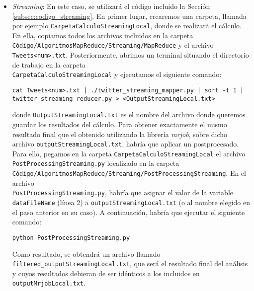 \documentclass[10pt, spanish]{article}
\begin{document}
\begin{appendices}
\begin{itemize}
\begin{itemize}
\begin{itemize}
\end{itemize}
\item \textit{Streaming}: En este caso, se utilizará el código incluido la Sección \ref{subsec:codigo_streaming}. En primer lugar, crearemos una carpeta, llamada por ejemplo \texttt{CarpetaCalculoStreamingLocal}, donde se realizará el cálculo. En ella, copiamos todos los archivos incluidos en la carpeta \\
\texttt{Código/AlgoritmosMapReduce/Streaming/MapReduce} y el archivo \texttt{Tweets<num>.txt}. Posteriormente, abrimos un terminal situando el directorio de trabajo en la carpeta \\
\texttt{CarpetaCalculoStreamingLocal} y ejecutamos el siguiente comando:

\texttt{cat \texttt{Tweets<num>.txt} | ./twitter\_streaming\_mapper.py | sort -t 1 | \newline  twitter\_streaming\_reducer.py \hspace{1mm} >\hspace{1mm} <OutputStreamingLocal.txt>}

donde \texttt{OutputStreamingLocal.txt} es el nombre del archivo donde queremos guardar los resultados del cálculo. Para obtener exactamente el mismo resultado final que el obtenido utilizando la librería \textit{mrjob}, sobre dicho archivo \texttt{outputStreamingLocal.txt}, habría que aplicar un postprocesado. Para ello, pegamos en la carpeta \texttt{CarpetaCalculoStreamingLocal} el archivo \texttt{PostProcessingStreaming.py} localizado en la carpeta \\
\texttt{Código/AlgoritmosMapReduce/Streaming/PostProcessingStreaming}. En el archivo \\
\texttt{PostProcessingStreaming.py}, habría que asignar el valor de la variable \texttt{dataFileName} (línea 2) a \texttt{outputStreamingLocal.txt} (o al nombre elegido en el paso anterior en su caso). A continuación, habría que ejecutar el siguiente comando:

\texttt{python PostProcessingStreaming.py}

Como resultado, se obtendrá un archivo llamado \texttt{filtered\_outputStreamingLocal.txt}, que será el resultado final del análisis y cuyos resultados debieran de ser idénticos a los incluidos en \texttt{outputMrjobLocal.txt}.


\end{itemize}
\end{itemize}
\end{appendices}
\end{document}
